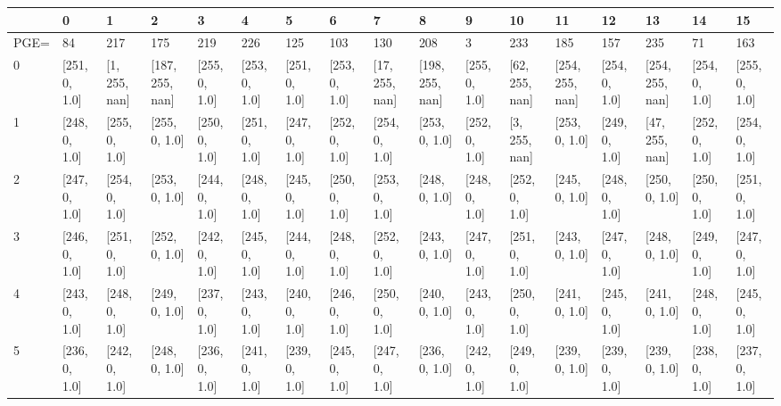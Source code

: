 \begin{tabular}{lllllllllllllllll}
\toprule
{} &             0  &             1  &               2  &             3  &             4  &             5  &             6  &              7  &               8  &             9  &              10 &               11 &             12 &               13 &             14 &             15 \\
\midrule
PGE= &             84 &            217 &              175 &            219 &            226 &            125 &            103 &             130 &              208 &              3 &             233 &              185 &            157 &              235 &             71 &            163 \\
0    &  [251, 0, 1.0] &  [1, 255, nan] &  [187, 255, nan] &  [255, 0, 1.0] &  [253, 0, 1.0] &  [251, 0, 1.0] &  [253, 0, 1.0] &  [17, 255, nan] &  [198, 255, nan] &  [255, 0, 1.0] &  [62, 255, nan] &  [254, 255, nan] &  [254, 0, 1.0] &  [254, 255, nan] &  [254, 0, 1.0] &  [255, 0, 1.0] \\
1    &  [248, 0, 1.0] &  [255, 0, 1.0] &    [255, 0, 1.0] &  [250, 0, 1.0] &  [251, 0, 1.0] &  [247, 0, 1.0] &  [252, 0, 1.0] &   [254, 0, 1.0] &    [253, 0, 1.0] &  [252, 0, 1.0] &   [3, 255, nan] &    [253, 0, 1.0] &  [249, 0, 1.0] &   [47, 255, nan] &  [252, 0, 1.0] &  [254, 0, 1.0] \\
2    &  [247, 0, 1.0] &  [254, 0, 1.0] &    [253, 0, 1.0] &  [244, 0, 1.0] &  [248, 0, 1.0] &  [245, 0, 1.0] &  [250, 0, 1.0] &   [253, 0, 1.0] &    [248, 0, 1.0] &  [248, 0, 1.0] &   [252, 0, 1.0] &    [245, 0, 1.0] &  [248, 0, 1.0] &    [250, 0, 1.0] &  [250, 0, 1.0] &  [251, 0, 1.0] \\
3    &  [246, 0, 1.0] &  [251, 0, 1.0] &    [252, 0, 1.0] &  [242, 0, 1.0] &  [245, 0, 1.0] &  [244, 0, 1.0] &  [248, 0, 1.0] &   [252, 0, 1.0] &    [243, 0, 1.0] &  [247, 0, 1.0] &   [251, 0, 1.0] &    [243, 0, 1.0] &  [247, 0, 1.0] &    [248, 0, 1.0] &  [249, 0, 1.0] &  [247, 0, 1.0] \\
4    &  [243, 0, 1.0] &  [248, 0, 1.0] &    [249, 0, 1.0] &  [237, 0, 1.0] &  [243, 0, 1.0] &  [240, 0, 1.0] &  [246, 0, 1.0] &   [250, 0, 1.0] &    [240, 0, 1.0] &  [243, 0, 1.0] &   [250, 0, 1.0] &    [241, 0, 1.0] &  [245, 0, 1.0] &    [241, 0, 1.0] &  [248, 0, 1.0] &  [245, 0, 1.0] \\
5    &  [236, 0, 1.0] &  [242, 0, 1.0] &    [248, 0, 1.0] &  [236, 0, 1.0] &  [241, 0, 1.0] &  [239, 0, 1.0] &  [245, 0, 1.0] &   [247, 0, 1.0] &    [236, 0, 1.0] &  [242, 0, 1.0] &   [249, 0, 1.0] &    [239, 0, 1.0] &  [239, 0, 1.0] &    [239, 0, 1.0] &  [238, 0, 1.0] &  [237, 0, 1.0] \\

\end{tabular}
